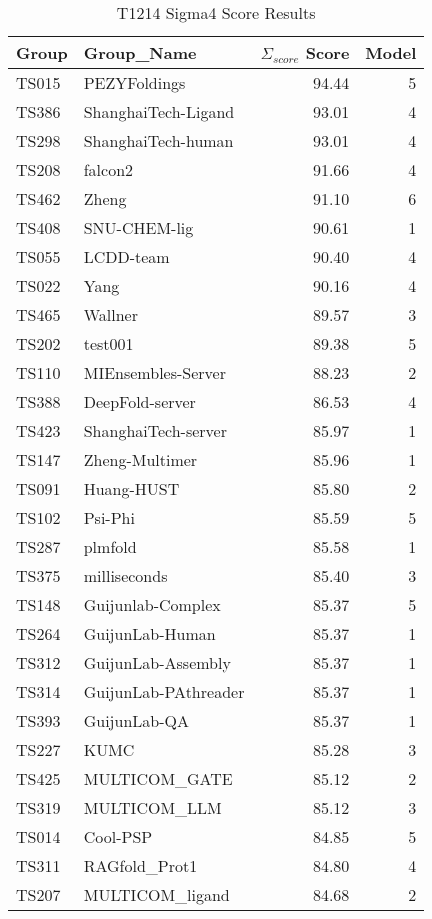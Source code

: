 \begin{table*}[ht]
\caption{T1214 Sigma4 Score Results}
\label{tab:T1214_Sigma_score_split}
\scriptsize
\begin{minipage}[t]{0.48\textwidth}
\centering
\begin{tabular}{llrr}
\toprule
Group & Group\_Name & $\Sigma_{score}$ Score & Model \\ 
\midrule
TS015 & PEZYFoldings & 94.44 & 5 \\ 
TS386 & ShanghaiTech-Ligand & 93.01 & 4 \\ 
TS298 & ShanghaiTech-human & 93.01 & 4 \\ 
TS208 & falcon2 & 91.66 & 4 \\ 
TS462 & Zheng & 91.10 & 6 \\ 
TS408 & SNU-CHEM-lig & 90.61 & 1 \\ 
TS055 & LCDD-team & 90.40 & 4 \\ 
TS022 & Yang & 90.16 & 4 \\ 
TS465 & Wallner & 89.57 & 3 \\ 
TS202 & test001 & 89.38 & 5 \\ 
TS110 & MIEnsembles-Server & 88.23 & 2 \\ 
TS388 & DeepFold-server & 86.53 & 4 \\ 
TS423 & ShanghaiTech-server & 85.97 & 1 \\ 
TS147 & Zheng-Multimer & 85.96 & 1 \\ 
TS091 & Huang-HUST & 85.80 & 2 \\ 
TS102 & Psi-Phi & 85.59 & 5 \\ 
TS287 & plmfold & 85.58 & 1 \\ 
TS375 & milliseconds & 85.40 & 3 \\ 
TS148 & Guijunlab-Complex & 85.37 & 5 \\ 
TS264 & GuijunLab-Human & 85.37 & 1 \\ 
TS312 & GuijunLab-Assembly & 85.37 & 1 \\ 
TS314 & GuijunLab-PAthreader & 85.37 & 1 \\ 
TS393 & GuijunLab-QA & 85.37 & 1 \\ 
TS227 & KUMC & 85.28 & 3 \\ 
TS425 & MULTICOM\_GATE & 85.12 & 2 \\ 
TS319 & MULTICOM\_LLM & 85.12 & 3 \\ 
TS014 & Cool-PSP & 84.85 & 5 \\ 
TS311 & RAGfold\_Prot1 & 84.80 & 4 \\ 
TS207 & MULTICOM\_ligand & 84.68 & 2 \\ 

\end{tabular}
\end{minipage}
\end{table*}
